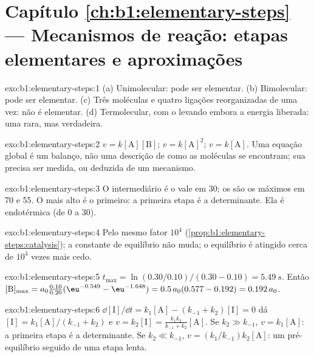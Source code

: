 \section*{Capítulo \ref{ch:b1:elementary-steps} --- Mecanismos de reação: etapas elementares e aproximações}

\begin{solution}{exo:b1:elementary-steps:1}
(a) Unimolecular: pode ser elementar. (b) Bimolecular: pode ser elementar.
(c) Três moléculas e quatro ligações reorganizadas de uma vez: não é
elementar. (d) Termolecular, com o  levando embora a energia
liberada: uma  rara, mas verdadeira.
\end{solution}

\begin{solution}{exo:b1:elementary-steps:2}
$v = k[\mathrm{A}][\mathrm{B}]$; $v = k[\mathrm{A}]^2$; $v = k[\mathrm{A}]$.
Uma equação global é um balanço, não uma descrição de como as moléculas
se encontram; sua  precisa ser medida, ou deduzida de
um mecanismo.
\end{solution}

\begin{solution}{exo:b1:elementary-steps:3}
O intermediário é o vale em 30; os  são os máximos
em 70 e 55. O  mais alto é o primeiro: a primeira
etapa é a determinante. Ela é endotérmica (de 0 a 30).
\end{solution}

\begin{solution}{exo:b1:elementary-steps:4}
Pelo mesmo fator $10^4$ (\cref{prop:b1:elementary-steps:catalysis}); a
constante de equilíbrio não muda; o equilíbrio é atingido cerca de
$10^4$ vezes mais cedo.
\end{solution}

\begin{solution}{exo:b1:elementary-steps:5}
$t_{\max} = \ln(0.30/0.10)/(0.30 - 0.10) = \qty{5.49}{s}$. Então
$[\mathrm{B}]_{\max} = a_0\frac{0.10}{0.20}(\eu^{-0.549} - \eu^{-1.648}) =
0.5\,a_0(0.577 - 0.192) = 0.192\,a_0$.
\end{solution}

\begin{solution}{exo:b1:elementary-steps:6}
$\dd[\mathrm{I}]/\dd t = k_1[\mathrm{A}] - (k_{-1} + k_2)[\mathrm{I}] = 0$
dá $[\mathrm{I}] = k_1[\mathrm{A}]/(k_{-1} + k_2)$ e $v = k_2[\mathrm{I}]
= \frac{k_1k_2}{k_{-1}+k_2}[\mathrm{A}]$. Se $k_2 \gg k_{-1}$, $v =
k_1[\mathrm{A}]$: a primeira etapa é a determinante. Se $k_2 \ll k_{-1}$,
$v = (k_1/k_{-1})k_2[\mathrm{A}]$: um pré-equilíbrio seguido de uma etapa
lenta.
\end{solution}

